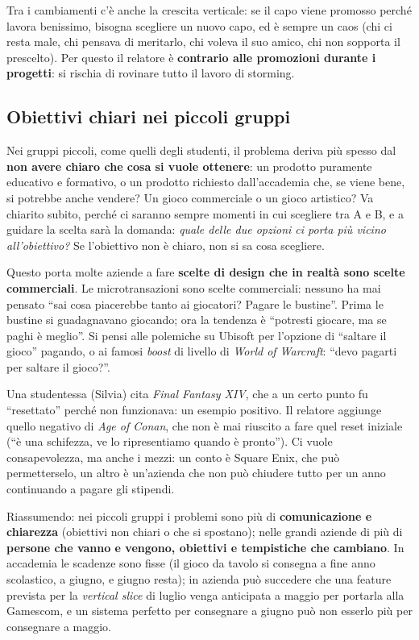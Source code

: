 Tra i cambiamenti c'è anche la crescita verticale: se il capo viene promosso
perché lavora benissimo, bisogna scegliere un nuovo capo, ed è sempre un
caos (chi ci resta male, chi pensava di meritarlo, chi voleva il suo amico,
chi non sopporta il prescelto). Per questo il relatore è \textbf{contrario
alle promozioni durante i progetti}: si rischia di rovinare tutto il lavoro di
storming.

\subsection{Obiettivi chiari nei piccoli gruppi}

Nei gruppi piccoli, come quelli degli studenti, il problema deriva più
spesso dal \textbf{non avere chiaro che cosa si vuole ottenere}: un prodotto
puramente educativo e formativo, o un prodotto richiesto dall'accademia che,
se viene bene, si potrebbe anche vendere? Un gioco commerciale o un gioco
artistico? Va chiarito subito, perché ci saranno sempre momenti in cui
scegliere tra A e B, e a guidare la scelta sarà la domanda: \emph{quale delle
due opzioni ci porta più vicino all'obiettivo?} Se l'obiettivo non è chiaro,
non si sa cosa scegliere.

Questo porta molte aziende a fare \textbf{scelte di design che in realtà sono
scelte commerciali}. Le microtransazioni sono scelte commerciali: nessuno ha
mai pensato ``sai cosa piacerebbe tanto ai giocatori? Pagare le bustine''.
Prima le bustine si guadagnavano giocando; ora la tendenza è ``potresti
giocare, ma se paghi è meglio''. Si pensi alle polemiche su Ubisoft per
l'opzione di ``saltare il gioco'' pagando, o ai famosi \emph{boost} di livello
di \emph{World of Warcraft}: ``devo pagarti per saltare il gioco?''.

Una studentessa (Silvia) cita \emph{Final Fantasy XIV}, che a un certo punto fu
``resettato'' perché non funzionava: un esempio positivo. Il relatore aggiunge
quello negativo di \emph{Age of Conan}, che non è mai riuscito a fare quel
reset iniziale (``è una schifezza, ve lo ripresentiamo quando è pronto''). Ci
vuole consapevolezza, ma anche i mezzi: un conto è Square Enix, che può
permetterselo, un altro è un'azienda che non può chiudere tutto per un anno
continuando a pagare gli stipendi.

Riassumendo: nei piccoli gruppi i problemi sono più di
\textbf{comunicazione e chiarezza} (obiettivi non chiari o che si spostano);
nelle grandi aziende di più di \textbf{persone che vanno e vengono, obiettivi
e tempistiche che cambiano}. In accademia le scadenze sono fisse (il gioco da
tavolo si consegna a fine anno scolastico, a giugno, e giugno resta); in
azienda può succedere che una feature prevista per la \emph{vertical slice}
di luglio venga anticipata a maggio per portarla alla Gamescom, e un sistema
perfetto per consegnare a giugno può non esserlo più per consegnare a maggio.

